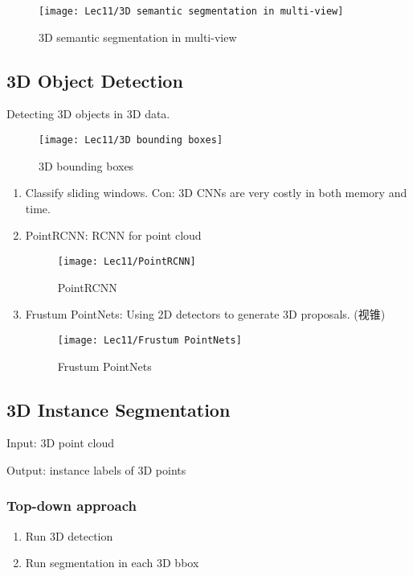 \begin{figure}[H]
    \centering
    \texttt{[image: Lec11/3D semantic segmentation in multi-view]}
    \caption{3D semantic segmentation in multi-view}
\end{figure}

\subsection{3D Object Detection}
Detecting 3D objects in 3D data. 

\begin{figure}[H]
    \centering
    \texttt{[image: Lec11/3D bounding boxes]}
    \caption{3D bounding boxes}
\end{figure}

\begin{enumerate}
    \item Classify sliding windows. 
    Con: 3D CNNs are very costly in both memory and time. 
    \item PointRCNN: RCNN for point cloud
    \begin{figure}[H]
        \centering
        \texttt{[image: Lec11/PointRCNN]}
        \caption{PointRCNN}
    \end{figure}
    \item Frustum  PointNets: Using 2D detectors to generate 3D proposals. (视锥)
    \begin{figure}[H]
        \centering
        \texttt{[image: Lec11/Frustum PointNets]}
        \caption{Frustum PointNets}
    \end{figure}
\end{enumerate}

\subsection{3D Instance Segmentation}
Input: 3D point cloud

Output: instance labels of 3D points

\subsubsection{Top-down approach}
\begin{enumerate}
    \item Run 3D detection
    \item Run segmentation in each 3D bbox
\end{enumerate}


